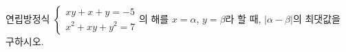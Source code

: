 연립방정식 $\begin{cases} xy+x+y=-5 \\ x^2+xy+y^2=7 \end{cases}$의 해를 $x=\alpha$, $y=\beta$라 할 때, $|\alpha-\beta|$의 최댓값을 구하시오.
